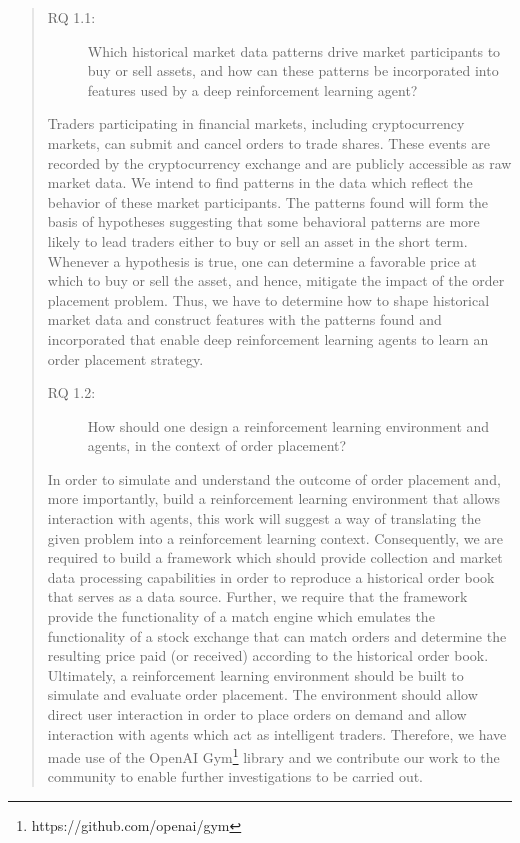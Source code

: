 \begin{quote}
\begin{description}
    \item[RQ 1.1:] Which historical market data patterns drive market participants to buy or sell assets, and how can these patterns be incorporated into features used by a deep reinforcement learning agent?
\end{description}
    Traders participating in financial markets, including cryptocurrency markets, can submit and cancel orders to trade shares.
    These events are recorded by the cryptocurrency exchange and are publicly accessible as raw market data.
    We intend to find patterns in the data which reflect the behavior of these market participants.
    The patterns found will form the basis of hypotheses suggesting that some behavioral patterns are more likely to lead traders either to buy or sell an asset in the short term.
    Whenever a hypothesis is true, one can determine a favorable price at which to buy or sell the asset, and hence, mitigate the impact of the order placement problem.
    Thus, we have to determine how to shape historical market data and construct features with the patterns found and incorporated that enable deep reinforcement learning agents to learn an order placement strategy.

\begin{description}
    \item[RQ 1.2:] How should one design a reinforcement learning environment and agents, in the context of order placement?
\end{description}
    In order to simulate and understand the outcome of order placement and, more importantly, build a reinforcement learning environment that allows interaction with agents, this work will suggest a way of translating the given problem into a reinforcement learning context.
    Consequently, we are required to build a framework which should provide collection and market data processing capabilities in order to reproduce a historical order book that serves as a data source.
    Further, we require that the framework provide the functionality of a match engine which emulates the functionality of a stock exchange that can match orders and determine the resulting price paid (or received) according to the historical order book.
    Ultimately, a reinforcement learning environment should be built to simulate and evaluate order placement.
    The environment should allow direct user interaction in order to place orders on demand and allow interaction with agents which act as intelligent traders.
    Therefore, we have made use of the OpenAI Gym\footnote{https://github.com/openai/gym} library and we contribute our work to the community to enable further investigations to be carried out.
    

\end{quote}
